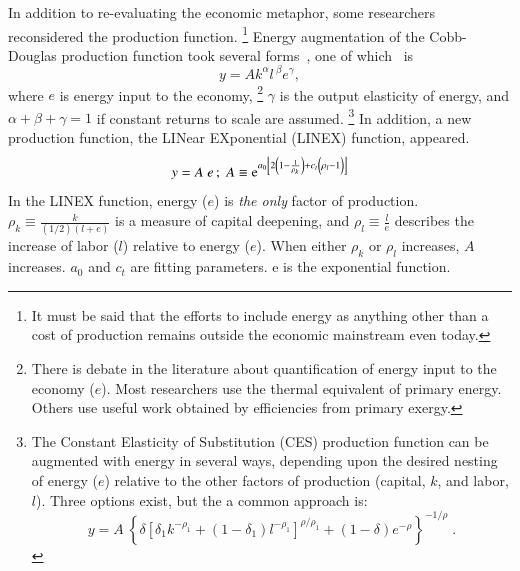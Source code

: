 In addition to re-evaluating the economic metaphor,
some researchers reconsidered the production function.%
	\footnote{
	It must be said that the efforts to include energy 
	as anything other than a cost of production 
	remains outside the economic mainstream even today.
	}
Energy augmentation of the Cobb-Douglas production function
took several forms~\cite[Equation~1]{Kavrakoglu:1983vi}, 
one of which~\cite[Equation~3.10]{Kummel:1985vz} is 
%
\begin{equation} \label{eq:cobb-douglas_with_energy}
	y = A k^{\alpha} l \, ^\beta e^{\gamma} ,
\end{equation}	 
%
where $e$ is energy input to the economy,%
	\footnote{
	There is debate in the literature about quantification of 
	energy input to the economy ($e$).
	Most researchers use the thermal equivalent 
	of primary energy.\cite{Cleveland:1984aa, Froling:2009vo, Stern:2012ey, Nel:2010fv}
	Others use useful work obtained by efficiencies from primary exergy.\cite{Ayres:2010ug}
	}
$\gamma$ is the output elasticity of energy, and 
$\alpha + \beta + \gamma = 1$ if constant returns to scale are assumed.%
	\footnote{
	The Constant Elasticity of Substitution (CES) production function
	can be augmented with energy in several ways, 
	depending upon the desired nesting of energy ($e$) relative to the other
	factors of production 
	(capital, $k$, and labor, $l$).\cite{rath1981energy, Zwaan:2002aa}
	Three options exist, but the a common approach is:
	\begin{equation*}
		y = A \: \left\{\delta \left[\delta_1 k^{-\rho_1} 
		    + (1-\delta_1)l^{-\rho_1} \right]^{\rho/\rho_1} 
		    + (1-\delta) e^{-\rho} \right\}^{-1/\rho} \; .
	\end{equation*}
	}
In addition, a new production function, 
the LINear EXponential (LINEX) function, 
appeared.\cite{Ayres:2010ug, Kummel:1980wx, Kummel:1982vy}
%
\begin{equation} \label{eq:LINEX}
  y = A \; e \, ; \; A \equiv \mathrm{e}^{a_0\left[2 \left(1 - \frac{1}{\rho_k} \right) 
    + c_t \left(\vphantom{\frac{1}{\rho_k}}\rho_l - 1 \right)\right]}
\end{equation}
%
In the LINEX function, energy ($e$) is \emph{the only} factor of production.
$\rho_k \equiv \frac{k}{(1/2)(l+e)}$ is a measure of capital deepening,
and $\rho_l \equiv \frac{l}{e}$ describes the increase of labor ($l$)
relative to energy ($e$).
When either $\rho_k$ or $\rho_l$ increases, $A$ increases.
$a_0$ and $c_t$ are fitting parameters. 
e is the exponential function.

